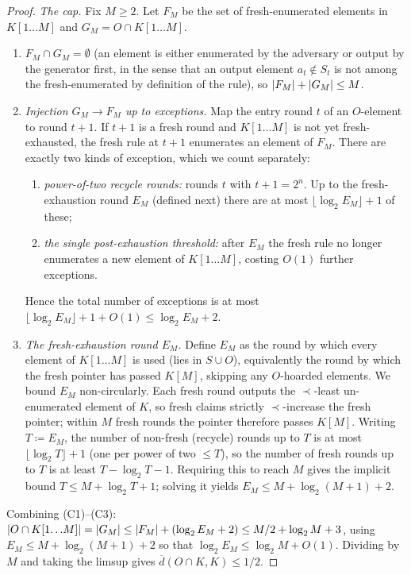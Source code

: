 \documentclass[11pt]{article}
\numberwithin{equation}{section}
\newcommand{\defeq}{\coloneqq}
\DeclarePairedDelimiter{\abs}{\lvert}{\rvert}
\newcommand{\Seen}{S}
\newcommand{\Out}{O}
\newcommand{\dup}[2]{\overline{d}(#1,#2)}
\newcommand{\rest}[2]{#1[1\!\dots\! #2]}
\theoremstyle{plain}
\theoremstyle{definition}
\theoremstyle{remark}
\begin{document}
\begin{proof}
\emph{The cap.} Fix $M \ge 2$. Let $F_M$ be the set of fresh-enumerated elements in
$\rest{K}{M}$ and $G_M = \Out \cap \rest{K}{M}$.
\begin{enumerate}[label=\textup{(C\arabic*)}, leftmargin=3.4em]
  \item $F_M \cap G_M = \emptyset$ (an element is either enumerated by the adversary or output
    by the generator first, in the sense that an output element $a_t \notin \Seen_t$ is not
    among the fresh-enumerated by definition of the rule), so $\abs{F_M} + \abs{G_M} \le M$.
  \item \emph{Injection $G_M \to F_M$ up to exceptions.} Map the entry round $t$ of an
    $\Out$-element to round $t+1$. If $t+1$ is a fresh round and $\rest{K}{M}$ is not yet
    fresh-exhausted, the fresh rule at $t+1$ enumerates an element of $F_M$. There are exactly
    two kinds of exception, which we count separately:
    \begin{enumerate}[label=\textup{(\roman*)}, leftmargin=2.4em]
  \item \emph{power-of-two recycle rounds:} rounds $t$ with $t+1 = 2^n$. Up to the
    fresh-exhaustion round $E_M$ (defined next) there are at most $\lfloor \log_2 E_M \rfloor
    + 1$ of these;
  \item \emph{the single post-exhaustion threshold:} after $E_M$ the fresh rule no longer
    enumerates a new element of $\rest{K}{M}$, costing $O(1)$ further exceptions.
    \end{enumerate}
Hence the total number of exceptions is at most $\lfloor \log_2 E_M \rfloor + 1 + O(1) \le
\log_2 E_M + 2$.
  \item \emph{The fresh-exhaustion round $E_M$.} Define $E_M$ as the round by which every
    element of $\rest{K}{M}$ is used (lies in $\Seen \cup \Out$), equivalently the round by
    which the fresh pointer has passed $K[M]$, skipping any $\Out$-hoarded elements. We bound
    $E_M$ non-circularly. Each fresh round outputs the $\prec$-least un-enumerated element of
    $K$, so fresh claims strictly $\prec$-increase the fresh pointer; within $M$ fresh rounds
    the pointer therefore passes $K[M]$. Writing $T \defeq E_M$, the number of non-fresh
    (recycle) rounds up to $T$ is at most $\lfloor \log_2 T \rfloor + 1$ (one per power of two
    $\le T$), so the number of fresh rounds up to $T$ is at least $T - \log_2 T - 1$.
    Requiring this to reach $M$ gives the implicit bound $T \le M + \log_2 T + 1$; solving it
    yields $E_M \le M + \log_2(M+1) + 2$.
\end{enumerate}
Combining (C1)--(C3): $\abs{\Out \cap \rest{K}{M}} = \abs{G_M} \le \abs{F_M} + (\log_2 E_M +
2) \le M/2 + \log_2 M + 3$, using $E_M \le M + \log_2(M+1) + 2$ so that $\log_2 E_M \le \log_2
M + O(1)$. Dividing by $M$ and taking the limsup gives $\dup{\Out \cap K}{K} \le 1/2$.


\end{proof}
\end{document}
